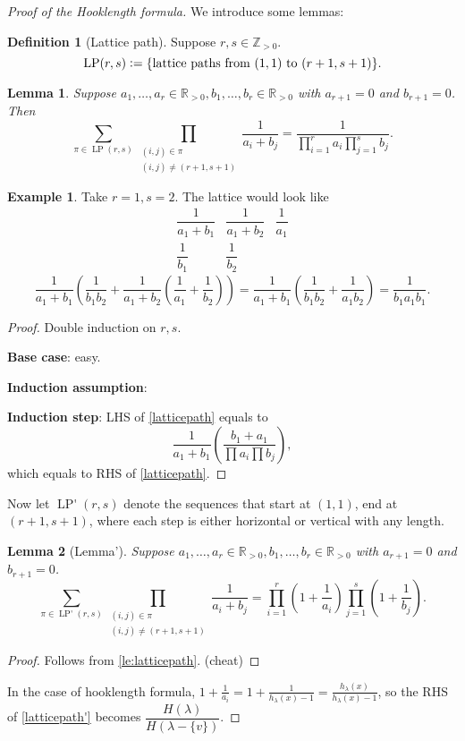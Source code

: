 \documentclass{report}
\newcommand{\R}{\mathbb{R}}
\newcommand{\Z}{\mathbb{Z}}
\newcommand{\defeq}{\vcentcolon=}
\newtheorem{lemma}{Lemma}[section]
\theoremstyle{definition}
\newtheorem{definition}{Definition}[section]
\newtheorem{example}{Example}[section]
\theoremstyle{remark}
\numberwithin{equation}{section}
\begin{document}
\begin{proof}[Proof of the Hooklength formula]
We introduce some lemmas:
\begin{definition}[Lattice path]
    Suppose $r, s \in \Z_{>0}$. \[\operatorname{LP}(r, s) \defeq \{\text{lattice paths from $(1, 1)$ to $(r + 1, s + 1)$}\}.\]
\end{definition}
\begin{lemma}\label{le:latticepath}
    Suppose $a_1, \ldots, a_r \in \R_{>0}, b_1, \ldots, b_r \in \R_{>0}$ with $a_{r + 1} = 0$ and $b_{r + 1} = 0$. Then \begin{equation}\label{latticepath}
        \sum_{\pi \in \operatorname{LP}(r, s)} \prod_{\substack{(i, j) \in \pi \\ (i, j) \neq (r+1, s+1)}} \frac{1}{a_i + b_j} = \frac{1}{\prod_{i=1}^r a_i\prod_{j=1}^s b_j}.
    \end{equation}
\end{lemma}
\begin{example}
    Take $r = 1, s = 2$. The lattice would look like \[\begin{array}{ccc}
        \dfrac{1}{a_1 + b_1} & \dfrac{1}{a_1 + b_2} & \dfrac{1}{a_1} \\[1em]
        \dfrac{1}{b_1} & \dfrac{1}{b_2} &
    \end{array}\]
    \[
        \frac{1}{a_1 + b_1}\left(\frac{1}{b_1b_2} + \frac{1}{a_1 + b_2}\left(\frac{1}{a_1} + \frac{1}{b_2}\right)\right) = \frac{1}{a_1 + b_1}\left(\frac{1}{b_1b_2} + \frac{1}{a_1b_2}\right) = \frac{1}{b_1a_1b_1}.
    \]  
\end{example}

\begin{proof} 
    Double induction on $r, s$.

    \textbf{Base case}: easy.

    \textbf{Induction assumption}:

    \textbf{Induction step}: LHS of \eqref{latticepath} equals to \[\frac{1}{a_1 + b_1}\left(\frac{b_1 + a_1}{\prod a_i \prod b_j}\right),\]
    which equals to RHS of \eqref{latticepath}.
\end{proof}

Now let $\operatorname{LP'}(r, s)$ denote the sequences that start at $(1, 1)$, end at $(r+1, s+1)$, where each step is either horizontal or vertical with any length.
   
\begin{lemma}[Lemma']
    Suppose $a_1, \ldots, a_r \in \R_{>0}, b_1, \ldots, b_r \in \R_{>0}$ with $a_{r + 1} = 0$ and $b_{r + 1} = 0$.
    \begin{equation}\label{latticepath'}
        \sum_{\pi \in \operatorname{LP'}(r, s)} \prod_{\substack{(i, j) \in \pi \\ (i, j) \neq (r+1, s+1)}} \frac{1}{a_i + b_j} = \prod_{i=1}^r \left(1 + \frac{1}{a_i}\right)\prod_{j=1}^s \left(1 + \frac{1}{b_j}\right).
    \end{equation}
\end{lemma}
\begin{proof}
    Follows from \autoref{le:latticepath}. (cheat)
\end{proof}

In the case of hooklength formula, $\displaystyle 1 + \frac{1}{a_i} = 1 + \frac{1}{h_\lambda(x) - 1} = \frac{h_\lambda(x)}{h_\lambda(x) - 1}$, so the RHS of \eqref{latticepath'} becomes $\dfrac{H(\lambda)}{H(\lambda - \{v\})}$.
\end{proof}
\end{document}
